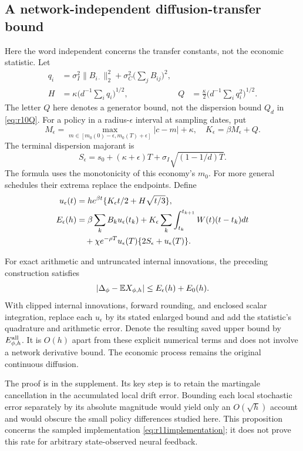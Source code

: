 \subsection{A network-independent diffusion-transfer bound}
Here the word independent concerns the transfer constants, not the economic statistic. Let
\begin{align*}
 q_i&=\sigma_I^2\|B_{i\cdot}\|_2^2+
                  \sigma_C^2\Big(\sum_jB_{ij}\Big)^2,\\
 H&=\kappa\Big(d^{-1}\sum_i q_i\Big)^{1/2},&
 Q&=\frac\kappa2\Big(d^{-1}\sum_i q_i^2\Big)^{1/2}.
\end{align*}
The letter $Q$ here denotes a generator bound, not the dispersion bound $Q_d$ in \eqref{eq:r10Q}. For a policy in a radius-$\epsilon$ interval at sampling dates, put
\[
 M_\epsilon=\max_{m\in[m_0(0)-\epsilon,m_0(T)+\epsilon]}|c-m|+\kappa,
 \quad K_\epsilon=\beta M_\epsilon+Q.
\]
The terminal dispersion majorant is
\[
 S_\epsilon=s_0+(\kappa+\epsilon)T+
                         \sigma_I\sqrt{(1-1/d)T}.
\]
The formula uses the monotonicity of this economy's $m_0$. For more general schedules their extrema replace the endpoints. Define
\begin{align}
 u_\epsilon(t)&=h e^{\beta t}
       \{K_\epsilon t/2+H\sqrt{t/3}\},\label{eq:r11strong}\\
 E_\epsilon(h)&=\beta\sum_k B_k u_\epsilon(t_k)
       +K_\epsilon\sum_k\int_{t_k}^{t_{k+1}}W(t)(t-t_k)dt\notag\\
 &\quad+\chi e^{-\rho T}u_\epsilon(T)
                             \{2S_\epsilon+u_\epsilon(T)\}.
 \label{eq:r11bias}
\end{align}

\begin{proposition}\label{prop:r11transfer}
For exact arithmetic and untruncated internal innovations, the preceding construction satisfies
\[
 |\Delta_\phi-\mathbb E X_{\phi,h}|
       \leq E_\epsilon(h)+E_0(h).
\]
With clipped internal innovations, forward rounding, and enclosed scalar integration, replace each $u_\epsilon$ by its stated enlarged bound and add the statistic's quadrature and arithmetic error. Denote the resulting saved upper bound by $E_{\phi,h}^{\rm all}$. It is $O(h)$ apart from these explicit numerical terms and does not involve a network derivative bound. The economic process remains the original continuous diffusion.
\end{proposition}

The proof is in the supplement. Its key step is to retain the martingale cancellation in the accumulated local drift error. Bounding each local stochastic error separately by its absolute magnitude would yield only an $O(\sqrt h)$ account and would obscure the small policy differences studied here. This proposition concerns the sampled implementation \eqref{eq:r11implementation}; it does not prove this rate for arbitrary state-observed neural feedback.

